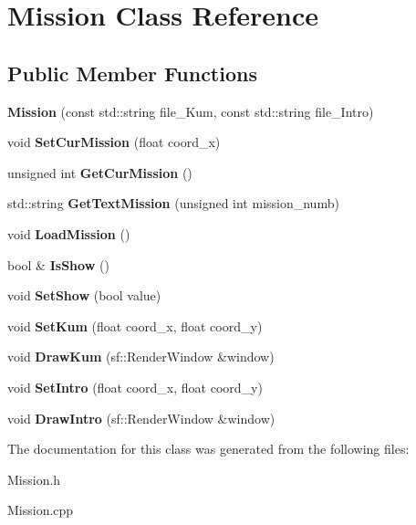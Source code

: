 \hypertarget{class_mission}{}\section{Mission Class Reference}
\label{class_mission}
\subsection*{Public Member Functions}
\begin{DoxyCompactItemize}
\item 
\mbox{\label{class_mission_a740ba1b69124dbb0f70daf74f513305b}} 
{\bfseries Mission} (const std\+::string file\+\_\+\+Kum, const std\+::string file\+\_\+\+Intro)
\item 
\mbox{\label{class_mission_ac33b0d9fe70c1b3957ce5b1e8b6c0f3e}} 
void {\bfseries Set\+Cur\+Mission} (float coord\+\_\+x)
\item 
\mbox{\label{class_mission_a89bbed0549015c07ab3381e32e335a23}} 
unsigned int {\bfseries Get\+Cur\+Mission} ()
\item 
\mbox{\label{class_mission_ae5383a2bd4c5c3c21ea9eba4c1c46a3a}} 
std\+::string {\bfseries Get\+Text\+Mission} (unsigned int mission\+\_\+numb)
\item 
\mbox{\label{class_mission_acc25406e4bbe28749081eb0a0d81031a}} 
void {\bfseries Load\+Mission} ()
\item 
\mbox{\label{class_mission_a67b3876fda2635511f7e24c373e2b6a3}} 
bool \& {\bfseries Is\+Show} ()
\item 
\mbox{\label{class_mission_a11a5f5ac9b25334c5e75d80350f535f7}} 
void {\bfseries Set\+Show} (bool value)
\item 
\mbox{\label{class_mission_ac2f25c4f3a8fd7bb66d6bce9eb2ca9ae}} 
void {\bfseries Set\+Kum} (float coord\+\_\+x, float coord\+\_\+y)
\item 
\mbox{\label{class_mission_a4fcc2cd3642b539229534358ca17efcc}} 
void {\bfseries Draw\+Kum} (sf\+::\+Render\+Window \&window)
\item 
\mbox{\label{class_mission_a2568f94df43f8fa470069cc9a1091a94}} 
void {\bfseries Set\+Intro} (float coord\+\_\+x, float coord\+\_\+y)
\item 
\mbox{\label{class_mission_ae7bfdc2586760ca48393a22bcf9e774f}} 
void {\bfseries Draw\+Intro} (sf\+::\+Render\+Window \&window)
\end{DoxyCompactItemize}


The documentation for this class was generated from the following files\+:\begin{DoxyCompactItemize}
\item 
Mission.\+h\item 
Mission.\+cpp\end{DoxyCompactItemize}
